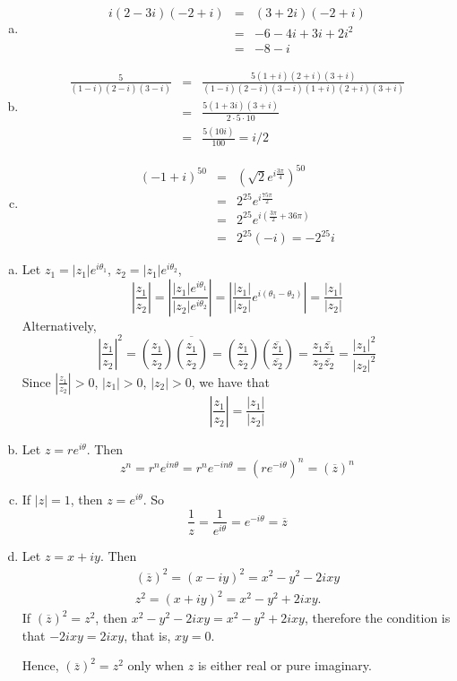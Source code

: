 \vspace{2mm}
\begin{enumerate}[a)]
  \item
\begin{eqnarray*}
  i(2-3i)(-2+i)&=&(3+2i)(-2+i)\\
	&=&-6-4i+3i+2i^2\\
	&=&-8-i
\end{eqnarray*}
	\item
\begin{eqnarray*}
  \frac{5}{(1-i)(2-i)(3-i)}&=&\frac{5(1+i)(2+i)(3+i)}{(1-i)(2-i)(3-i)(1+i)(2+i)(3+i)}\\
	&=&\frac{5(1+3i)(3+i)}{2 \cdot 5 \cdot 10}\\
	&=&\frac{5(10i)}{100}=i/2
\end{eqnarray*}
	\item
\begin{eqnarray*}
(-1+i)^{50}&=&\left(\sqrt{2}e^{i\frac{3\pi}{4}}  \right)^{50}\\
&=&2^{25}e^{i\frac{75\pi}{2}}\\
&=&2^{25}e^{i\left(\frac{3\pi}{2}+36\pi\right)}\\
&=&2^{25}(-i)=-2^{25}i
\end{eqnarray*}
\end{enumerate}

\vspace{2mm}
\begin{enumerate}[a)]
  \item
Let $z_1=|z_1|e^{i\theta_1}$, $z_2=|z_1|e^{i\theta_2}$,
$$
\left|\frac{z_1}{z_2}\right|=\left|\frac{|z_1|e^{i\theta_1}}{|z_2|e^{i\theta_2}}\right|
=\left|\frac{|z_1|}{|z_2|}e^{i(\theta_1-\theta_2)}\right|=\frac{|z_1|}{|z_2|}
$$
Alternatively,
$$
\left|\frac{z_1}{z_2}\right|^2=\left(\frac{z_1}{z_2}\right)\overline{\left(\frac{z_1}{z_2}\right)}
=\left(\frac{z_1}{z_2}\right)\left(\frac{\overline{z_1}}{\overline{z_2}}\right) =
\frac{z_1\overline{z_1}}{z_2\overline{z_2}}=\frac{|z_1|^2}{|z_2|^2}
$$
Since $\left|\frac{z_1}{z_2}\right|>0$, $|z_1|>0$, $|z_2|>0$, we have that
$$
\left|\frac{z_1}{z_2}\right| = \frac{\left|z_1\right|}{\left|z_2\right|}
$$
	\item Let $z=re^{i\theta}$. Then
$$
z^n=r^ne^{in\theta}=r^ne^{-in\theta}=\left(re^{-i\theta}\right)^n=(\overline{z})^n
$$
	\item
If $|z|=1$, then $z=e^{i\theta}$. So
$$
\frac{1}{z}=\frac{1}{e^{i\theta}}=e^{-i\theta}=\overline{z}
$$
	\item
Let $z=x+iy$. Then
\begin{eqnarray*}
  (\overline{z})^2 = (x-iy)^2=x^2-y^2-2ixy\\
	z^2 = (x+iy)^2 = x^2 - y^2 + 2ixy.
\end{eqnarray*}
If $(\overline{z})^2=z^2$, then $x^2-y^2-2ixy = x^2 - y^2 + 2ixy$, therefore the condition is that $-2ixy = 2ixy$, that is, $xy=0$.

Hence, $(\overline{z})^2=z^2$ only when $z$ is either real or pure imaginary.
\end{enumerate}


